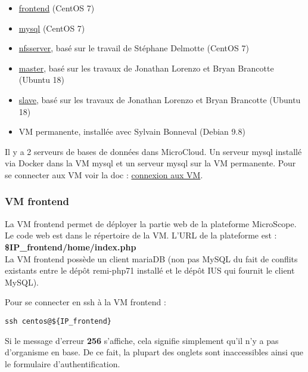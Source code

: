 \begin{itemize}
	\item \href{https://github.com/IFB-ElixirFr/biosphere-microcloud/tree/master/frontend/}{frontend} (CentOS 7)
	\item \href{https://github.com/IFB-ElixirFr/biosphere-microcloud/tree/master/mysql/}{mysql} (CentOS 7)
	\item \href{https://github.com/IFB-ElixirFr/biosphere-microcloud/tree/master/nfsserver/}{nfsserver}, basé sur le travail de Stéphane Delmotte (CentOS 7)
	\item \href{https://github.com/IFB-ElixirFr/biosphere-microcloud/tree/master/master/}{master}, basé sur les travaux de Jonathan Lorenzo et Bryan Brancotte (Ubuntu 18)
	\item \href{https://github.com/IFB-ElixirFr/biosphere-microcloud/tree/master/slave/}{slave}, basé sur les travaux de Jonathan Lorenzo et Bryan Brancotte (Ubuntu 18)
	\item VM permanente, installée avec Sylvain Bonneval (Debian 9.8)
\end{itemize}
Il y a 2 serveurs de bases de données dans MicroCloud. Un serveur mysql installé via Docker dans la VM mysql et un serveur mysql sur la VM permanente. Pour se connecter aux VM voir la doc : \href{https://intranet.genoscope.cns.fr/agc/redmine/projects/microcloud/wiki/Connexion_aux_VM}{connexion aux VM}.

\subsubsection {VM frontend}

La VM frontend permet de déployer la partie web de la plateforme MicroScope.
Le code web est dans le répertoire  de la VM.
L'URL de la plateforme est : \textbf{\$IP\_frontend/home/index.php}\\
La VM frontend possède un client mariaDB (non pas MySQL du fait de conflits existants entre le dépôt remi-php71 installé et le dépôt IUS qui fournit le client MySQL).
\newline

Pour se connecter en ssh à la VM frontend : 
\begin{lstlisting}[style=Bash]
ssh centos@${IP_frontend}
\end{lstlisting}

\begin{mycolorbox}
	Si le message d’erreur \textbf{256} s’affiche, cela signifie simplement qu’il n’y a pas d’organisme en base.
	De ce fait, la plupart des onglets sont inaccessibles ainsi que le formulaire d’authentification.
\end{mycolorbox}

